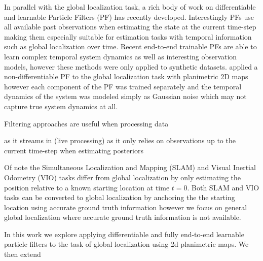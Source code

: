     In parallel with the global localization task, a rich body of work on differentiable and learnable Particle Filters (PF) has recently developed. Interestingly PFs use all available past observations when estimating the state at the current time-step making them especially suitable for estimation tasks with temporal information such as global localization over time. Recent end-to-end trainable PFs are able to learn complex temporal system dynamics as well as interesting observation models, however these methods were only applied to synthetic datasets.   applied a non-differentiable PF to the global localization task with planimetric 2D maps however each component of the PF was trained separately and the temporal dynamics of the system was modeled simply as Gaussian noise which may not capture true system dynamics at all. 

    Filtering approaches are useful when processing data 
    
    as it streams in (live processing) as it only relies on observations up to the current time-step when estimating posteriors
    

    

    Of note the Simultaneous Localization and Mapping (SLAM)  and Visual Inertial Odometry (VIO)  tasks differ from global localization by only estimating the position relative to a known starting location at time $t=0$. Both SLAM and VIO tasks can be converted to global localization by anchoring the the starting location using accurate ground truth information however we focus on general global localization where accurate ground truth information is not available.

    In this work we explore applying differentiable and fully end-to-end learnable particle filters to the task of global localization using 2d planimetric maps.  We then extend

    
    
    

    
    


